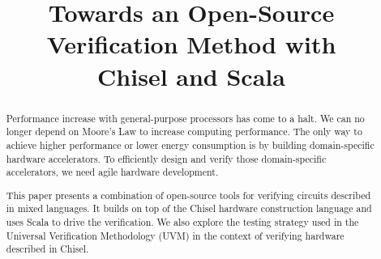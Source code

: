 \documentclass[conference]{IEEEtran}
\newcommand{\martin}[1]{{\color{blue} Martin: #1}}
\newcommand{\kasper}[1]{{\color{purple} Kasper: #1}}
\renewcommand{\martin}[1]{}
\renewcommand{\kasper}[1]{}
\begin{document}

\title{Towards an Open-Source Verification Method with\\
Chisel and Scala}

\author{
\and
{}
}



\maketitle \thispagestyle{empty}

\begin{abstract}
Performance increase with general-purpose processors has come to a halt.
We can no longer depend on Moore's Law to increase computing performance.
The only way to achieve higher performance or lower energy consumption
is by building domain-specific hardware accelerators.
To efficiently design and verify those domain-specific accelerators, we need
agile hardware development.

This paper presents a combination of open-source tools for verifying
circuits described in mixed languages. It builds on top of the Chisel
hardware construction language and uses Scala to drive the verification. 
We also explore the testing strategy used in the Universal Verification Methodology
(UVM) in the context of verifying hardware described in Chisel.

\kasper{I feel that we should also mention UVM somewhere / why we're interested in exploring what if offers (because it's the industry "standard"?)?}
\martin{Agree.}

\end{abstract}
\end{document}
